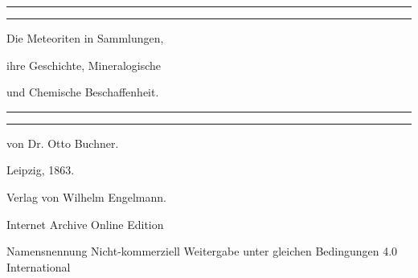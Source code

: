 \documentclass[a4paper, 11pt, oneside]{article}
\begin{document}
\begin{titlepage} %
	\centering %

	
	\rule{\textwidth}{1.6pt}\vspace*{-\baselineskip}\vspace*{2pt} %
	\rule{\textwidth}{0.4pt} %
	
	\vspace{1.5\baselineskip} %
	
	{\Huge Die Meteoriten in Sammlungen,}
	
	\vspace{1\baselineskip} %

	{\Huge ihre Geschichte, Mineralogische}

	\vspace{1\baselineskip} %

	{\Huge und Chemische Beschaffenheit.}

	\vspace{1.5\baselineskip} %

	\rule{\textwidth}{0.4pt}\vspace*{-\baselineskip}\vspace{3.2pt} %
	\rule{\textwidth}{1.6pt} %
	
	\vspace{1\baselineskip} %
	
	
	{\LARGE von Dr. Otto Buchner.} %
	
	\vspace*{1\baselineskip} %
	
    
    \vspace*{\fill}

	\vspace{1\baselineskip}

	{Leipzig, 1863.}
	
	{Verlag von Wilhelm Engelmann.}
	
	\vspace{0.5\baselineskip} %

        Internet Archive Online Edition  %
	
	{ Namensnennung Nicht-kommerziell Weitergabe unter gleichen Bedingungen 4.0 International} %
\end{titlepage}
\setlength{\parskip}{1mm plus1mm minus1mm}
\clearpage
\tableofcontents
\clearpage
\LARGE
\pagestyle{fancy}
\fancyhf{}
\cfoot{\swabfamily{\thepage}}
\end{document}
